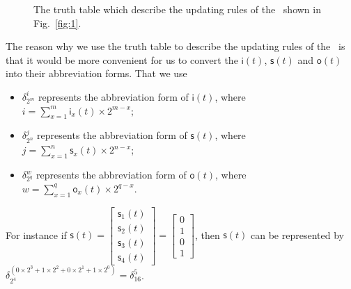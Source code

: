   \begin{figure}[thpb]
      \centering
      
      \caption{The truth table which describe the updating rules of the \BCN\ shown in Fig.~\ref{fig:1}.}
      \label{fig:2}
   \end{figure}

The reason why we use the truth table to describe the updating rules of the \BCN\ is that it would be more convenient for us to convert the $\mathsf{i}(t)$, $\mathsf{s}(t)$ and $\mathsf{o}(t)$ into their abbreviation forms. 
That we use 
\begin{itemize}
  \item $\delta^i_{2^m}$ represents the abbreviation form of $\mathsf{i}(t)$, where $i=\sum_{x=1}^m \mathsf{i}_{x}(t)\times 2^{m-x}$;
  \item $\delta^j_{2^n}$ represents the abbreviation form of $\mathsf{s}(t)$, where $j=\sum_{x=1}^n \mathsf{s}_{x}(t)\times 2^{n-x}$;
  \item $\delta^w_{2^q}$ represents the abbreviation form of $\mathsf{o}(t)$, where  $w=\sum_{x=1}^q \mathsf{o}_{x}(t)\times 2^{q-x}$.
\end{itemize}

For instance if $\mathsf{s}(t)=\begin{bmatrix}\mathsf{s}_1(t)\\\mathsf{s}_2(t) \\ \mathsf{s}_3(t) \\\mathsf{s}_4(t)\end{bmatrix}=\begin{bmatrix}0\\1\\0\\1\end{bmatrix}$, then $\mathsf{s}(t)$ can be represented by $\delta^{(0\times2^3+1\times2^2+0\times2^1+1\times2^0)}_{2^4}=\delta^5_{16}$. 

